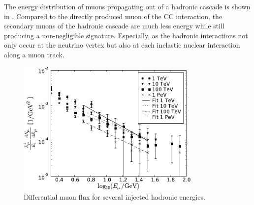 The energy distribution of muons propagating out of a hadronic cascade is shown in .
Compared to the directly produced muon of the CC interaction, the secondary muons of the hadronic cascade are much less energy while still producing a non-negligible signature.
Especially, as the hadronic interactions not only occur at the neutrino vertex but also at each inelastic nuclear interaction along a muon track.
\begin{figure}
    \centering
    \includegraphics[width=0.8\textwidth]{./images/muon_flux_hadronic_shower.pdf}
    \caption{Differential muon flux for several injected hadronic energies. \cite{Panknin09ICRC}}
    \label{fig:mu_flux_hadr_shower}
\end{figure}
